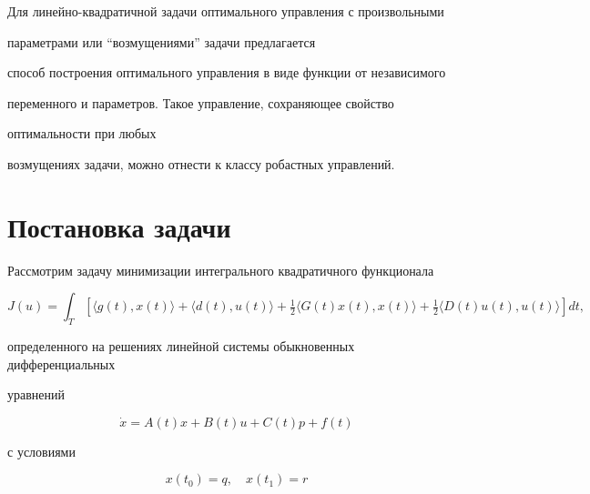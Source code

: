 

\maketitle


\label{begin}


 


Для линейно-квадратичной задачи оптимального управления с произвольными 


параметрами или ``возмущениями'' задачи предлагается 


способ построения оптимального управления в виде функции от независимого 


переменного и параметров. Такое управление, сохраняющее свойство


оптимальности при любых 


возмущениях задачи, можно отнести к классу робастных управлений.








\section{Постановка задачи}





Рассмотрим задачу минимизации интегрального квадратичного функционала


\begin{equation}


J(u)=\int_{T}[\langle g(t),x(t)\rangle+\langle d(t),u(t)\rangle+


\tfrac{1}{2}\langle G(t)x(t),x(t)\rangle+\tfrac{1}{2}


\langle D(t)u(t),u(t)\rangle]dt,


\end{equation}


определенного на решениях линейной системы обыкновенных дифференциальных 


уравнений


\begin{equation}


\Dot {x}=A(t)x+B(t)u+C(t)p+f(t)


\end{equation}


с условиями 


\begin{equation}


x(t_{0})=q, \quad x(t_{1})=r


\end{equation}


